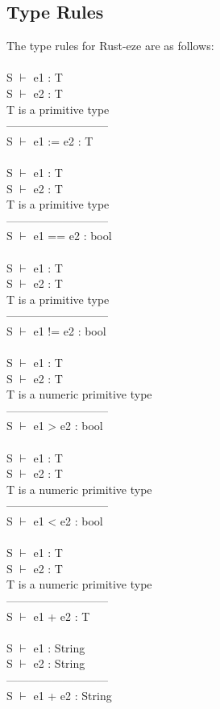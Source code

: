 \documentclass[letterpaper, 10pt, DIV=13]{scrartcl}
\numberwithin{equation}{section}
\numberwithin{figure}{section}
\numberwithin{table}{section}
\begin{document}
\subsection{Type Rules}
The type rules for Rust-eze are as follows: \\ \\
S $\vdash$ e1 : T \\
S $\vdash$ e2 : T \\
T is a primitive type \\
--------------------------- \\
S $\vdash$ e1 := e2 : T \\
\\
S $\vdash$ e1 : T \\
S $\vdash$ e2 : T \\
T is a primitive type \\
--------------------------- \\
S $\vdash$ e1 == e2 : bool \\
\\
S $\vdash$ e1 : T \\
S $\vdash$ e2 : T \\
T is a primitive type \\
--------------------------- \\
S $\vdash$ e1 != e2 : bool \\
\\
S $\vdash$ e1 : T \\
S $\vdash$ e2 : T \\
T is a numeric primitive type \\
--------------------------- \\
S $\vdash$ e1 > e2 : bool \\
\\
S $\vdash$ e1 : T \\
S $\vdash$ e2 : T \\
T is a numeric primitive type \\
--------------------------- \\
S $\vdash$ e1 < e2 : bool \\
\\
S $\vdash$ e1 : T \\
S $\vdash$ e2 : T \\
T is a numeric primitive type \\
--------------------------- \\
S $\vdash$ e1 + e2 : T \\
\\
S $\vdash$ e1 : String \\
S $\vdash$ e2 : String \\
--------------------------- \\
S $\vdash$ e1 + e2 : String
\end{document}
